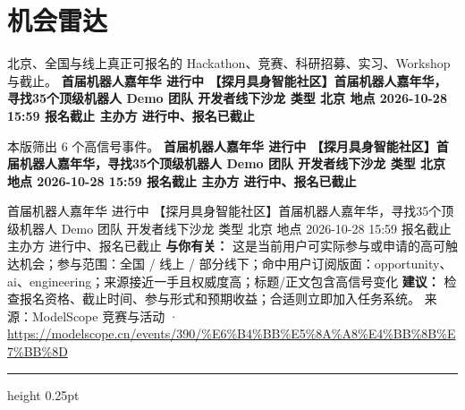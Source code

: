 \documentclass[10.5pt]{ctexart}
\begin{document}
\section*{机会雷达}
{\color{ormuted} 北京、全国与线上真正可报名的 Hackathon、竞赛、科研招募、实习、Workshop 与截止。}
\vspace{2mm}
{\LARGE\bfseries 首届机器人嘉年华 进行中 【探月具身智能社区】首届机器人嘉年华，寻找35个顶级机器人 Demo 团队 开发者线下沙龙 类型 北京 地点 2026-10-28 15:59 报名截止 主办方 进行中、报名已截止}\par
\vspace{1mm}
{\color{ormuted} 本版筛出 6 个高信号事件。}
\vspace{3mm}
{\Large\bfseries 首届机器人嘉年华 进行中 【探月具身智能社区】首届机器人嘉年华，寻找35个顶级机器人 Demo 团队 开发者线下沙龙 类型 北京 地点 2026-10-28 15:59 报名截止 主办方 进行中、报名已截止}\par
首届机器人嘉年华 进行中 【探月具身智能社区】首届机器人嘉年华，寻找35个顶级机器人 Demo 团队 开发者线下沙龙 类型 北京 地点 2026-10-28 15:59 报名截止 主办方 进行中、报名已截止
\textbf{与你有关：} 这是当前用户可实际参与或申请的高可触达机会；参与范围：全国 / 线上 / 部分线下；命中用户订阅版面：opportunity、ai、engineering；来源接近一手且权威度高；标题/正文包含高信号变化
\textbf{建议：} 检查报名资格、截止时间、参与形式和预期收益；合适则立即加入任务系统。
{\footnotesize\color{ormuted} 来源：ModelScope 竞赛与活动 · \url{https://modelscope.cn/events/390/%E6%B4%BB%E5%8A%A8%E4%BB%8B%E7%BB%8D}}
\vspace{4mm}
\hrule height 0.25pt
\vspace{3mm}
\end{document}

